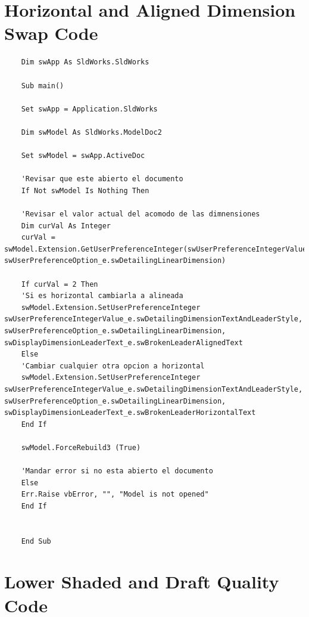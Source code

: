 \documentclass{report}
\begin{document}
\chapter{Horizontal and Aligned Dimension Swap Code}

\begin{lstlisting}
	Dim swApp As SldWorks.SldWorks
	
	Sub main()
	
	Set swApp = Application.SldWorks
	
	Dim swModel As SldWorks.ModelDoc2
	
	Set swModel = swApp.ActiveDoc
	
	'Revisar que este abierto el documento
	If Not swModel Is Nothing Then
	
	'Revisar el valor actual del acomodo de las dimnensiones
	Dim curVal As Integer
	curVal = swModel.Extension.GetUserPreferenceInteger(swUserPreferenceIntegerValue_e.swDetailingDimensionTextAndLeaderStyle, swUserPreferenceOption_e.swDetailingLinearDimension)
	
	If curVal = 2 Then
	'Si es horizontal cambiarla a alineada
	swModel.Extension.SetUserPreferenceInteger swUserPreferenceIntegerValue_e.swDetailingDimensionTextAndLeaderStyle, swUserPreferenceOption_e.swDetailingLinearDimension, swDisplayDimensionLeaderText_e.swBrokenLeaderAlignedText
	Else
	'Cambiar cualquier otra opcion a horizontal
	swModel.Extension.SetUserPreferenceInteger swUserPreferenceIntegerValue_e.swDetailingDimensionTextAndLeaderStyle, swUserPreferenceOption_e.swDetailingLinearDimension, swDisplayDimensionLeaderText_e.swBrokenLeaderHorizontalText
	End If
	
	swModel.ForceRebuild3 (True)
	
	'Mandar error si no esta abierto el documento
	Else
	Err.Raise vbError, "", "Model is not opened"
	End If
	
	
	End Sub
\end{lstlisting}

\chapter{Lower Shaded and Draft Quality Code}
\end{document}
